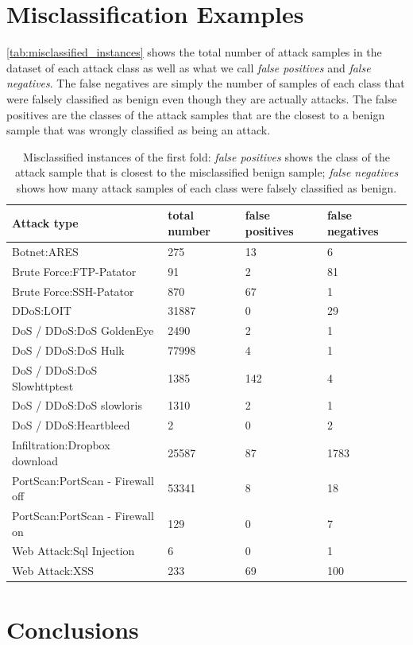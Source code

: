 \documentclass[sigconf,nonacm]{acmart}
\begin{document}
\section{Misclassification Examples}
\autoref{tab:misclassified_instances} shows the total number of attack samples in the dataset of each attack class as well as what we call \textit{false positives} and \textit{false negatives}. The false negatives are simply the number of samples of each class that were falsely classified as benign even though they are actually attacks. 
The false positives are the classes of the attack samples that are the closest to a benign sample that was wrongly classified as being an attack. 

\begin{table}
\caption{Misclassified instances of the first fold: \textit{false positives} shows the class of the attack sample that is closest to the misclassified benign sample; \textit{false negatives} shows how many attack samples of each class were falsely classified as benign.}
\label{tab:misclassified_instances}
\begin{tabular}{l l l l} 
\toprule 
Attack type & total number & false positives & false negatives \\
\midrule
Botnet:ARES  & 275 & 13 & 6 \\
Brute Force:FTP-Patator & 91 & 2 & 81 \\
Brute Force:SSH-Patator & 870 & 67 & 1 \\
DDoS:LOIT & 31887 & 0 & 29 \\
DoS / DDoS:DoS GoldenEye & 2490 & 2 & 1 \\
DoS / DDoS:DoS Hulk & 77998 & 4 & 1 \\
DoS / DDoS:DoS Slowhttptest & 1385 & 142 & 4 \\
DoS / DDoS:DoS slowloris & 1310 & 2 & 1 \\
DoS / DDoS:Heartbleed & 2 & 0 & 2 \\
Infiltration:Dropbox download & 25587 & 87 & 1783 \\
PortScan:PortScan - Firewall off & 53341 & 8 & 18 \\
PortScan:PortScan - Firewall on & 129 & 0 & 7 \\
Web Attack:Sql Injection & 6 & 0 & 1 \\
Web Attack:XSS & 233 & 69 & 100 \\
\bottomrule
\end{tabular}
\end{table}


\section{Conclusions}
\end{document}
